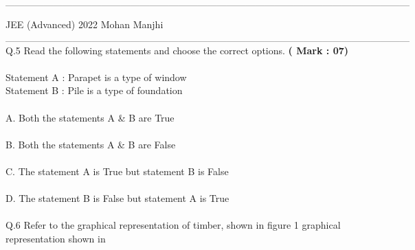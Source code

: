 \documentclass[10pt]{article}
\begin{document}
$$\textbf{------------------------------------------------------------------------------------------------------------------------------}$$
\nextpage
\begin{flushright}JEE (Advanced) 2022 \;\;\;\;\;\;\;\;\;\;\;\;\;\;\;\;\;\;\;\;\;\;\;\;\;\;\;\;\;\;\;\;\;\;\;\;\;\;\;\;\;\;\;\;\;\;\;\;\;\;\;\;\;\;\;\;\;\;\;\;\;\;\;\;\;\;\;\;\;\;\;\;\;\;\;\;\;\;\;\;\;\;\;\;\;\;\;\;\;\;\;\;\;\;\;\;\;\;\;\;\;\;\;\;\;\;\;\;\;\;\;Mohan Manjhi\end{flushright}
$$\textbf{------------------------------------------------------------------------------------------------------------------------------}$$
Q.5 Read the following statements and choose the correct options. \hspace{30ex}\textbf{( Mark : 07)}\\ \\
\hspace*{10ex}Statement A : Parapet is a type of window  \\
\hspace*{10ex}Statement B : Pile is a type of foundation
\\ \\
%
\hspace*{4ex}A. Both the statements A \& B are True \\ \\
\hspace*{4ex}B. Both the statements A \& B are False \\ \\
\hspace*{4ex}C. The statement A is True but statement B is False \\ \\
\hspace*{4ex}D. The statement B is False but statement A is True \\ 
%
\\
Q.6 Refer to the graphical representation of timber, shown in figure 1
 graphical representation shown in 
 
\end{document}
